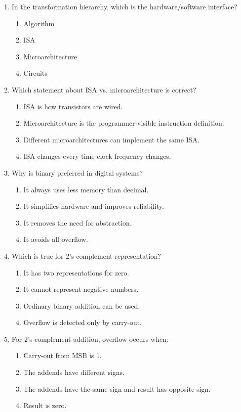 \documentclass[11pt]{article}
\begin{document}
\begin{enumerate}[label=\textbf{A\arabic*.}]
  \item In the transformation hierarchy, which is the hardware/software interface?
  \begin{enumerate}[label=(\Alph*)]
    \item Algorithm
    \item ISA
    \item Microarchitecture
    \item Circuits
  \end{enumerate}

  \item Which statement about ISA vs. microarchitecture is correct?
  \begin{enumerate}[label=(\Alph*)]
    \item ISA is how transistors are wired.
    \item Microarchitecture is the programmer-visible instruction definition.
    \item Different microarchitectures can implement the same ISA.
    \item ISA changes every time clock frequency changes.
  \end{enumerate}

  \item Why is binary preferred in digital systems?
  \begin{enumerate}[label=(\Alph*)]
    \item It always uses less memory than decimal.
    \item It simplifies hardware and improves reliability.
    \item It removes the need for abstraction.
    \item It avoids all overflow.
  \end{enumerate}

  \item Which is true for 2's complement representation?
  \begin{enumerate}[label=(\Alph*)]
    \item It has two representations for zero.
    \item It cannot represent negative numbers.
    \item Ordinary binary addition can be used.
    \item Overflow is detected only by carry-out.
  \end{enumerate}

  \item For 2's complement addition, overflow occurs when:
  \begin{enumerate}[label=(\Alph*)]
    \item Carry-out from MSB is 1.
    \item The addends have different signs.
    \item The addends have the same sign and result has opposite sign.
    \item Result is zero.
  \end{enumerate}


\end{enumerate}
\end{document}
